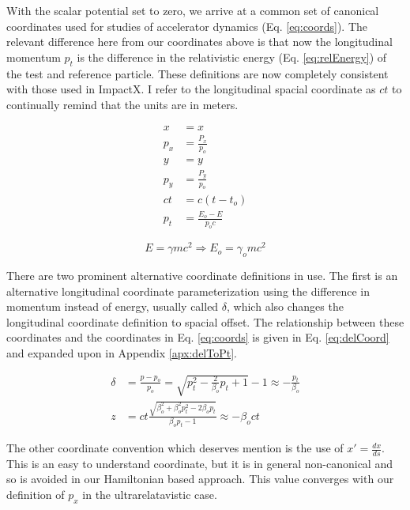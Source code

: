 With the scalar potential set to zero, we arrive at a common set of canonical coordinates used for studies of accelerator dynamics (Eq. \ref{eq:coords}). The relevant difference here from our coordinates above is that now the longitudinal momentum $p_t$ is the difference in the relativistic energy (Eq. \ref{eq:relEnergy}) of the test and reference particle. These definitions are now completely consistent with those used in ImpactX. I refer to the longitudinal spacial coordinate as $ct$ to continually remind that the units are in meters.

\begin{equation} \label{eq:coords}
\begin{split}
x &= x\\
p_x &= \frac{P_x}{p_o}\\
y &= y\\
p_y &= \frac{P_y}{p_o}\\
ct &= c(t-t_o)\\
p_t &= \frac{E_o-E}{p_o c}
\end{split}
\end{equation}

\begin{equation} \label{eq:relEnergy}
	E = \gamma m c^2 \Rightarrow E_o = \gamma_o m c^2
\end{equation}

There are two prominent alternative coordinate definitions in use. The first is an alternative longitudinal coordinate parameterization using the difference in momentum instead of energy, usually called $\delta$, which also changes the longitudinal coordinate definition to spacial offset. The relationship between these coordinates and the coordinates in Eq. \ref{eq:coords} is given in Eq. \ref{eq:delCoord} and expanded upon in Appendix \ref{apx:delToPt}.

\begin{equation} \label{eq:delCoord}
\begin{split}
	\delta &= \frac{p-p_o}{p_o} = \sqrt{p_t^2 -\frac{2}{\beta_o}p_t + 1} -1 \approx -\frac{p_t}{\beta_o}\\
	z &= ct\frac{\sqrt{\beta_o^2 + \beta_o^2 p_t^2 - 2\beta_o p_t}}{\beta_o p_t - 1} \approx  - \beta_o c t
\end{split}
\end{equation}

The other coordinate convention which deserves mention is the use of $x' = \frac{dx}{ds}$. This is an easy to understand coordinate, but it is in general non-canonical and so is avoided in our Hamiltonian based approach. This value converges with our definition of $p_x$ in the ultrarelatavistic case.

